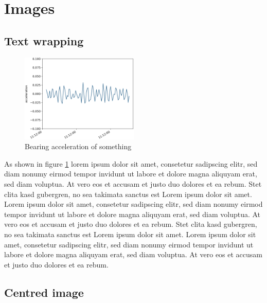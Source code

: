 \section{Images}
\label{sec:images}

\subsection{Text wrapping}
\label{sec:images:text_wrapping}

\begin{figure}
  \begin{center}
    \vspace{-1\intextsep}
    \hspace*{-.5\columnsep}
    \includegraphics[width=0.5\textwidth]{Resources/Images/Bearing/bearing_acceleration.png}
  \end{center}
  \caption{Bearing acceleration of something}
  \label{fig:images:acceleration}
\end{figure}

As shown in figure \ref{fig:images:acceleration} lorem ipsum dolor sit amet, consetetur sadipscing elitr, sed diam nonumy eirmod tempor invidunt ut labore et dolore magna aliquyam erat, sed diam voluptua.
At vero eos et accusam et justo duo dolores et ea rebum. Stet clita kasd gubergren, no sea takimata sanctus est Lorem ipsum dolor sit amet.
Lorem ipsum dolor sit amet, consetetur sadipscing elitr, sed diam nonumy eirmod tempor invidunt ut labore et dolore magna aliquyam erat, sed diam voluptua. At vero eos et accusam et justo duo dolores et ea rebum.
Stet clita kasd gubergren, no sea takimata sanctus est Lorem ipsum dolor sit amet. Lorem ipsum dolor sit amet, consetetur sadipscing elitr, sed diam nonumy eirmod tempor invidunt ut labore et dolore magna aliquyam erat, sed diam voluptua.
At vero eos et accusam et justo duo dolores et ea rebum. \cite{example_xy}

\subsection{Centred image}
\label{sec:images:centred_image}

